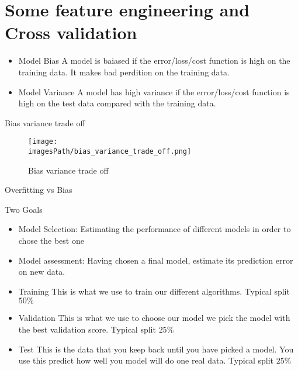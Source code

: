\newpage
\section{Some feature engineering and Cross validation}
\begin{itemize}
    \item Model Bias \newline
    A model is baiased if the error/loss/cost function is high on the training data. It makes bad perdition on the training data.
    \item Model Variance \newline
    A model has high variance if the error/loss/cost function is high on the test data compared with the training data. 
\end{itemize}

Bias variance trade off
\begin{figure}[!h]
    \centering
    \texttt{[image: \\imagesPath/bias\_variance\_trade\_off.png]}
    \caption{Bias variance trade off}
\end{figure}

Overfitting vs Bias 

Two Goals
\begin{itemize}
    \item Model Selection: \newline 
    Estimating the performance of different models in order to chose the best one 
    \item Model assessment: \newline 
    Having chosen a final model, estimate its prediction error on new data. 
\end{itemize}

\begin{itemize}
    \item Training \newline
    This is what we use to train our different algorithms. Typical split $50\%$
    \item Validation \newline 
    This is what we use to choose our model we pick the model with the best validation score. Typical split $25\%$
    \item Test \newline 
    This is the data that you keep back until you have picked a model. You use this predict how well you model will do one real data. Typical split $25\%$
\end{itemize}

